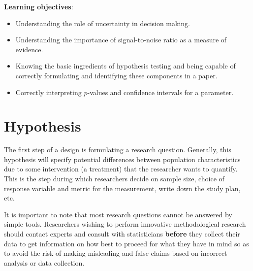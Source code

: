 \documentclass[
  11pt,
  letterpaper,
]{scrbook}
\providecommand{\tightlist}{%
  \setlength{\itemsep}{0pt}\setlength{\parskip}{0pt}}\usepackage{longtable,booktabs,array}
\theoremstyle{definition}
\theoremstyle{definition}
\theoremstyle{remark}
\begin{document}
\begin{tcolorbox}[enhanced jigsaw, left=2mm, leftrule=.75mm, coltitle=black, breakable, bottomrule=.15mm, colframe=quarto-callout-important-color-frame, titlerule=0mm, colbacktitle=quarto-callout-important-color!10!white, rightrule=.15mm, toprule=.15mm, title=\textcolor{quarto-callout-important-color}{\faExclamation}\hspace{0.5em}{Key concept}, opacityback=0, toptitle=1mm, bottomtitle=1mm, arc=.35mm, opacitybacktitle=0.6, colback=white]

\textbf{Learning objectives}:

\begin{itemize}
\tightlist
\item
  Understanding the role of uncertainty in decision making.
\item
  Understanding the importance of signal-to-noise ratio as a measure of
  evidence.
\item
  Knowing the basic ingredients of hypothesis testing and being capable
  of correctly formulating and identifying these components in a paper.
\item
  Correctly interpreting \(p\)-values and confidence intervals for a
  parameter.
\end{itemize}

\end{tcolorbox}

\section{Hypothesis}\label{hypothesis}

The first step of a design is formulating a research question.
Generally, this hypothesis will specify potential differences between
population characteristics due to some intervention (a treatment) that
the researcher wants to quantify. This is the step during which
researchers decide on sample size, choice of response variable and
metric for the measurement, write down the study plan, etc.

It is important to note that most research questions cannot be answered
by simple tools. Researchers wishing to perform innovative
methodological research should contact experts and consult with
statisticians \textbf{before} they collect their data to get information
on how best to proceed for what they have in mind so as to avoid the
risk of making misleading and false claims based on incorrect analysis
or data collection.
\end{document}
